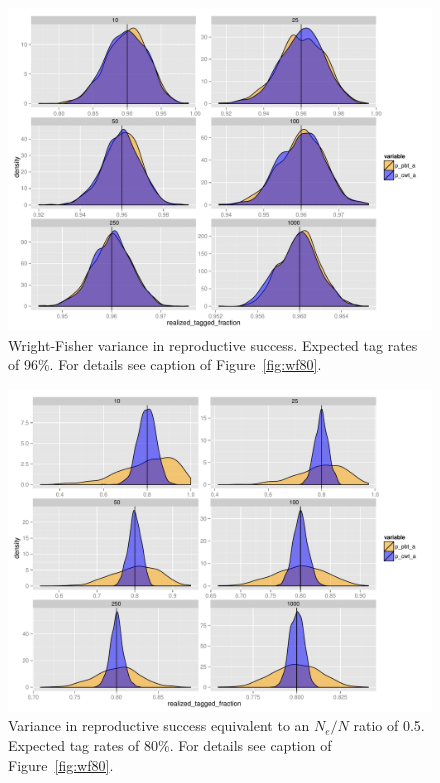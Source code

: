 \documentclass[11pt]{article}
\begin{document}
\begin{figure}
\includegraphics[width = \textwidth]{images/tag_fracts_96_WrightFisher.pdf}
\caption{Wright-Fisher variance in reproductive success. Expected tag rates of 96\%. For details
see caption of Figure~\protect\ref{fig:wf80}.}
\label{fig:wf96}
\end{figure}

\begin{figure}
\includegraphics[width = \textwidth]{images/tag_fracts_80_Ne50.pdf}
\caption{Variance in reproductive success equivalent to an $N_e/N$ ratio of 0.5. Expected tag rates of 80\%. For details
see caption of Figure~\protect\ref{fig:wf80}.}
\label{fig:ne50-80}
\end{figure}
\end{document}
